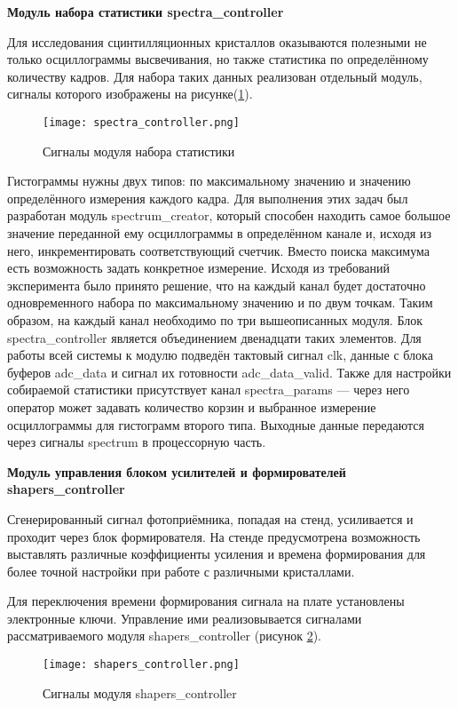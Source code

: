 \textbf{Модуль набора статистики spectra\_controller}\par
Для исследования сцинтилляционных кристаллов оказываются полезными не только осциллограммы высвечивания, но также статистика по определённому количеству кадров. Для набора таких данных реализован отдельный модуль, сигналы которого изображены на рисунке(\ref{fig:spectra_controller}).\par
\begin{figure}[ht]
    \centering
    \texttt{[image: spectra\_controller.png]}
    \caption{Сигналы модуля набора статистики}
    \label{fig:spectra_controller}
\end{figure}
Гистограммы нужны двух типов: по максимальному значению и значению определённого измерения каждого кадра. Для выполнения этих задач был разработан модуль spectrum\_creator, который способен находить самое большое значение переданной ему осциллограммы в определённом канале и, исходя из него, инкрементировать соответствующий счетчик. Вместо поиска максимума есть возможность задать конкретное измерение. Исходя из требований эксперимента было принято решение, что на каждый канал будет достаточно одновременного набора по максимальному значению и по двум точкам. Таким образом, на каждый канал необходимо по три вышеописанных модуля. Блок spectra\_controller является объединением двенадцати таких элементов. Для работы всей системы к модулю подведён тактовый сигнал clk, данные с блока буферов adc\_data и сигнал их готовности adc\_data\_valid. Также для настройки собираемой статистики присутствует канал spectra\_params --- через него оператор может задавать количество корзин и выбранное измерение осциллограммы для гистограмм второго типа. Выходные данные передаются через сигналы spectrum в процессорную часть.\par
\textbf{Модуль управления блоком усилителей и формирователей shapers\_controller}\par
Сгенерированный сигнал фотоприёмника, попадая на стенд, усиливается и проходит через блок формирователя. На стенде предусмотрена возможность выставлять различные коэффициенты усиления и времена формирования для более точной настройки при работе с различными кристаллами.\par
Для переключения времени формирования сигнала на плате установлены электронные ключи. Управление ими реализовывается сигналами рассматриваемого модуля shapers\_controller (рисунок \ref{fig:shapers_controller}).\par
\begin{figure}[ht]
    \centering
    \texttt{[image: shapers\_controller.png]}
    \caption{Сигналы модуля shapers\_controller}
    \label{fig:shapers_controller}
\end{figure}
